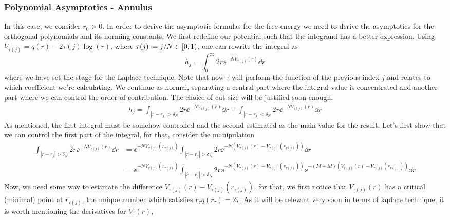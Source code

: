 \subsubsection{Polynomial Asymptotics - Annulus}

In this case, we consider $r_0 > 0$. In order to derive the asymptotic formulas for the free energy we need to derive the asymptotics for the orthogonal polynomials and its norming constants. We first redefine our potential such that the integrand has a better expression. Using $V_{\tau(j)} = q(r) - 2 \tau(j) \log(r)$, where $\tau(j) \deff j/N \in [0, 1)$, one can rewrite the integral as
\begin{equation}
	h_j = \int_{0}^{\infty} 2r \ee^{-N V_{\tau(j)}(r)} \dd r
\end{equation}
where we have set the stage for the Laplace technique. Note that now $\tau$ will perform the function of the previous index $j$ and relates to which coefficient we're calculating. We continue as normal, separating a central part where the integral value is concentrated and another part where we can control the order of contribution. The choice of cut-size will be justified soon enough.
\begin{align}
	h_j =  \int_{|r - r_j| > \delta_N} 2r \ee^{-N V_{\tau(j)}(r)} \dd r + \int_{|r - r_j| < \delta_N} 2r \ee^{-N V_{\tau(j)}(r)} \dd r
\end{align}
As mentioned, the first integral must be somehow controlled and the second estimated as the main value for the result. Let's first show that we can control the first part of the integral, for that, consider the manipulation
\begin{align}
	\int_{|r - r_j| > \delta_N} 2r \ee^{-N V_{\tau(j)}(r)} \dd r & = \ee^{-N V_{\tau(j)}(r_{\tau(j)})} \int_{|r - r_j| > \delta_N} 2r \ee^{-N \left( V_{\tau(j)}(r) - V_{\tau(j)}(r_{\tau(j)}) \right)} \dd r \\
	& = \ee^{-N V_{\tau(j)}(r_{\tau(j)})} \int_{|r - r_j| > \delta_N} 2r \ee^{-N \left( V_{\tau(j)}(r) - V_{\tau(j)}(r_{\tau(j)}) \right)}  \ee^{-(M-M) \left( V_{\tau(j)}(r) - V_{\tau(j)}(r_{\tau(j)}) \right)} \dd r
\end{align}
Now, we need some way to estimate the difference $V_{\tau(j)}(r) - V_{\tau(j)}(r_{\tau(j)})$, for that, we first notice that $V_{\tau(j)}(r)$ has a critical (minimal) point at $r_{\tau(j)}$, the unique number which satisfies $r_\tau q(r_\tau) = 2 \tau$. As it will be relevant very soon in terms of laplace technique, it is worth mentioning the derivatives for $V_\tau(r)$,
